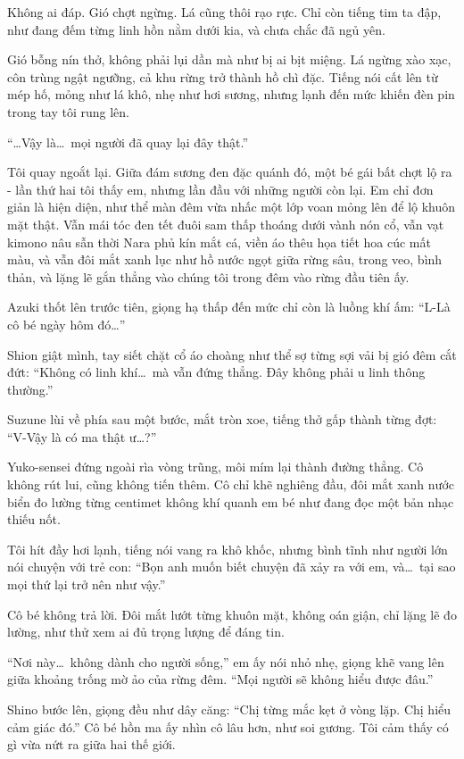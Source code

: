 \documentclass[../main.tex]{subfiles}
\begin{document}
Không ai đáp. Gió chợt ngừng. Lá cũng thôi rạo rực. Chỉ còn tiếng tim ta đập, như đang đếm từng linh hồn nằm dưới kia, và chưa chắc đã ngủ yên.

Gió bỗng nín thở, không phải lụi dần mà như bị ai bịt miệng. Lá ngừng xào xạc, côn trùng ngật ngưỡng, cả khu rừng trở thành hồ chì đặc. Tiếng nói cất lên từ mép hố, mỏng như lá khô, nhẹ như hơi sương, nhưng lạnh đến mức khiến đèn pin trong tay tôi rung lên.

``\dots Vậy là\dots\ mọi người đã quay lại đây thật.''

Tôi quay ngoắt lại. Giữa đám sương đen đặc quánh đó, một bé gái bất chợt lộ ra - lần thứ hai tôi thấy em, nhưng lần đầu với những người còn lại. Em chỉ đơn giản là hiện diện, như thể màn đêm vừa nhấc một lớp voan mỏng lên để lộ khuôn mặt thật. Vẫn mái tóc đen tết đuôi sam thấp thoáng dưới vành nón cổ, vẫn vạt kimono nâu sẫn thời Nara phủ kín mắt cá, viền áo thêu họa tiết hoa cúc mất màu, và vẫn đôi mắt xanh lục như hồ nước ngọt giữa rừng sâu, trong veo, bình thản, và lặng lẽ gắn thẳng vào chúng tôi trong đêm vào rừng đầu tiên ấy.

Azuki thốt lên trước tiên, giọng hạ thấp đến mức chỉ còn là luồng khí ấm: ``L-Là cô bé ngày hôm đó\dots''

Shion giật mình, tay siết chặt cổ áo choàng như thể sợ từng sợi vải bị gió đêm cắt đứt: ``Không có linh khí\dots\ mà vẫn đứng thẳng. Đây không phải u linh thông thường.''

Suzune lùi về phía sau một bước, mắt tròn xoe, tiếng thở gấp thành từng đợt: ``V-Vậy là có ma thật ư\dots?''

Yuko-sensei đứng ngoài rìa vòng trũng, môi mím lại thành đường thẳng. Cô không rút lui, cũng không tiến thêm. Cô chỉ khẽ nghiêng đầu, đôi mắt xanh nước biển đo lường từng centimet không khí quanh em bé như đang đọc một bản nhạc thiếu nốt.

Tôi hít đầy hơi lạnh, tiếng nói vang ra khô khốc, nhưng bình tĩnh như người lớn nói chuyện với trẻ con: ``Bọn anh muốn biết chuyện đã xảy ra với em, và\dots\ tại sao mọi thứ lại trở nên như vậy.''

Cô bé không trả lời. Đôi mắt lướt từng khuôn mặt, không oán giận, chỉ lặng lẽ đo lường, như thử xem ai đủ trọng lượng để đáng tin.

``Nơi này\dots\ không dành cho người sống,'' em ấy nói nhỏ nhẹ, giọng khẽ vang lên giữa khoảng trống mờ ảo của rừng đêm. ``Mọi người sẽ không hiểu được đâu.''

Shino bước lên, giọng đều như dây căng: ``Chị từng mắc kẹt ở vòng lặp. Chị hiểu cảm giác đó.'' Cô bé hồn ma ấy nhìn cô lâu hơn, như soi gương. Tôi cảm thấy có gì vừa nứt ra giữa hai thế giới.
\end{document}
